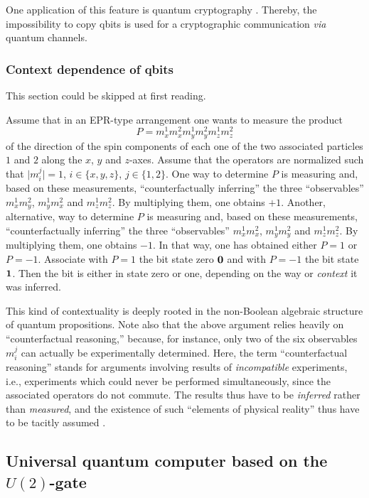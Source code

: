 One application of this feature is quantum cryptography
\cite{benn-82,benn-84,benn-92}. Thereby, the impossibility to copy
qbits
is used for a cryptographic communication {\em via} quantum channels.


\subsubsection{Context dependence of qbits}
\label{q:context}
This section could be skipped at first reading.

Assume that in an EPR-type arrangement
\cite{epr}
one wants to measure  the product
$$
P=
m_x^1m_x^2
m_y^1m_y^2
m_z^1m_z^2
$$
of the direction of the spin components of each one of the two
associated particles
$1$ and $2$ along the $x$, $y$ and $z$-axes.
Assume that the operators are normalized such that $\vert m_i^j\vert=1$,
$i\in \{ x,y,z\}$, $j\in \{ 1,2\}$.
One way to determine $P$
is
measuring
and, based on these measurements,
``counterfactually inferring'' \cite{peres,mermin}
the three ``observables''
$
m_x^1m_y^2$, $
m_y^1m_x^2$ and $
m_z^1m_z^2$.
By multiplying them, one obtains $+1$.
Another, alternative, way to determine $P$
is
measuring
and, based on these measurements,
``counterfactually inferring''
the three ``observables''
$
m_x^1m_x^2$, $
m_y^1m_y^2$ and $
m_z^1m_z^2$.
By multiplying them, one obtains
$-1$.
In that way, one has obtained
either $P=1$ or $P=-1$.
Associate with $P=1$ the bit state zero ${\bf 0}$ and with $P=-1$ the
bit state ${\bf 1}$.
Then the bit is either in state zero or one, depending on the way
or {\em context} it was inferred.

This kind of contextuality is deeply rooted in the non-Boolean
algebraic structure of quantum propositions.
Note also that the above argument relies heavily on ``counterfactual
reasoning,'' because, for instance, only two of the six observables
$m_i^j$ can actually be experimentally determined.
Here, the term ``counterfactual reasoning'' \cite{peres,mermin} stands
for arguments involving results of {\em incompatible} experiments, i.e.,
experiments which could never be performed simultaneously, since the
associated operators do not commute. The results thus have to be {\em
inferred} rather than {\em measured}, and the existence of such
``elements of physical reality'' thus have to be tacitly assumed
\cite{epr}.


\subsection{Universal quantum computer based on the $U(2)$-gate}


